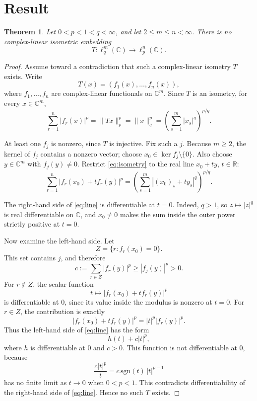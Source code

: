 \documentclass[11pt]{article}
\newtheorem{theorem}{Theorem}
\newcommand{\C}{\mathbb C}
\begin{document}
\section{Result}

\begin{theorem}\label{thm:main}
Let \(0<p<1<q<\infty\), and let \(2\le m\le n<\infty\). There is no complex-linear isometric embedding
\[
  T:\ell_q^m(\C)\longrightarrow \ell_p^n(\C).
\]
\end{theorem}

\begin{proof}
Assume toward a contradiction that such a complex-linear isometry \(T\) exists. Write
\[
  T(x)=(f_1(x),\ldots,f_n(x)),
\]
where \(f_1,\ldots,f_n\) are complex-linear functionals on \(\C^m\). Since \(T\) is an isometry, for every \(x\in\C^m\),
\begin{equation}\label{eq:isometry}
  \sum_{r=1}^n |f_r(x)|^p
  = \|Tx\|_p^p
  = \|x\|_q^p
  = \left(\sum_{s=1}^m |x_s|^q\right)^{p/q}.
\end{equation}

At least one \(f_j\) is nonzero, since \(T\) is injective. Fix such a \(j\). Because \(m\ge2\), the kernel of \(f_j\) contains a nonzero vector; choose \(x_0\in\ker f_j\setminus\{0\}\). Also choose \(y\in\C^m\) with \(f_j(y)\ne0\). Restrict \eqref{eq:isometry} to the real line \(x_0+ty\), \(t\in\mathbb R\):
\begin{equation}\label{eq:line}
  \sum_{r=1}^n |f_r(x_0)+t f_r(y)|^p
  =
  \left(\sum_{s=1}^m |(x_0)_s+t y_s|^q\right)^{p/q}.
\end{equation}

The right-hand side of \eqref{eq:line} is differentiable at \(t=0\). Indeed, \(q>1\), so \(z\mapsto |z|^q\) is real differentiable on \(\C\), and \(x_0\ne0\) makes the sum inside the outer power strictly positive at \(t=0\).

Now examine the left-hand side. Let
\[
  Z=\{r: f_r(x_0)=0\}.
\]
This set contains \(j\), and therefore
\[
  c:=\sum_{r\in Z}|f_r(y)|^p\ge |f_j(y)|^p>0.
\]
For \(r\notin Z\), the scalar function
\[
  t\mapsto |f_r(x_0)+t f_r(y)|^p
\]
is differentiable at \(0\), since its value inside the modulus is nonzero at \(t=0\). For \(r\in Z\), the contribution is exactly
\[
  |f_r(x_0)+t f_r(y)|^p=|t|^p |f_r(y)|^p.
\]
Thus the left-hand side of \eqref{eq:line} has the form
\[
  h(t)+c|t|^p,
\]
where \(h\) is differentiable at \(0\) and \(c>0\). This function is not differentiable at \(0\), because
\[
  \frac{c|t|^p}{t}=c\,\mathrm{sgn}(t)\,|t|^{p-1}
\]
has no finite limit as \(t\to0\) when \(0<p<1\). This contradicts differentiability of the right-hand side of \eqref{eq:line}. Hence no such \(T\) exists.
\end{proof}
\end{document}
